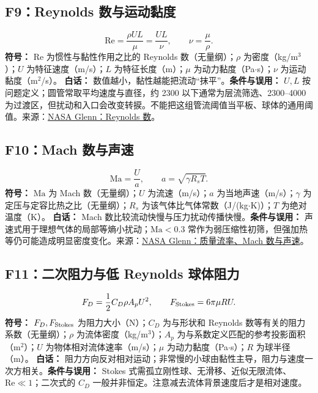 \documentclass[UTF8,zihao=-4,openany,oneside,fontset=windows]{ctexbook}
\begin{document}
\subsection{F9：Reynolds 数与运动黏度}
\begin{equation}
\mathrm{Re}=\frac{\rho UL}{\mu}=\frac{UL}{\nu},\qquad \nu=\frac\mu\rho.
\end{equation}
\textbf{符号：} $\mathrm{Re}$ 为惯性与黏性作用之比的 Reynolds 数（无量纲）；$\rho$ 为密度（kg/m$^3$）；$U$ 为特征速度（m/s）；$L$ 为特征长度（m）；$\mu$ 为动力黏度（Pa$\cdot$s）；$\nu$ 为运动黏度（m$^2$/s）。
\textbf{白话：} 数值越小，黏性越能把流动“抹平”。\textbf{条件与误用：} $U,L$ 按问题定义；圆管常取平均速度与直径，约 2300 以下通常为层流筛选、2300--4000 为过渡区，但扰动和入口会改变转捩。不能把这组管流阈值当平板、球体的通用阈值。来源：\href{https://www.grc.nasa.gov/WWW/k-12/airplane/reynolds.html}{NASA Glenn：Reynolds 数}。

\subsection{F10：Mach 数与声速}
\begin{equation}
\mathrm{Ma}=\frac Ua,\qquad a=\sqrt{\gamma R_sT}.
\end{equation}
\textbf{符号：} $\mathrm{Ma}$ 为 Mach 数（无量纲）；$U$ 为流速（m/s）；$a$ 为当地声速（m/s）；$\gamma$ 为定压与定容比热之比（无量纲）；$R_s$ 为该气体比气体常数（J/(kg$\cdot$K)）；$T$ 为绝对温度（K）。
\textbf{白话：} Mach 数比较流动快慢与压力扰动传播快慢。\textbf{条件与误用：} 声速式用于理想气体的局部等熵小扰动；$\mathrm{Ma}<0.3$ 常作为弱压缩性初筛，但强加热等仍可能造成明显密度变化。来源：\href{https://www1.grc.nasa.gov/beginners-guide-to-aeronautics/mass-flow-rate-equations/}{NASA Glenn：质量流率、Mach 数与声速}。

\subsection{F11：二次阻力与低 Reynolds 球体阻力}
\begin{equation}
F_D=\frac12C_D\rho A_pU^2,\qquad F_{\rm Stokes}=6\pi\mu RU.
\end{equation}
\textbf{符号：} $F_D,F_{\rm Stokes}$ 为阻力大小（N）；$C_D$ 为与形状和 Reynolds 数等有关的阻力系数（无量纲）；$\rho$ 为流体密度（kg/m$^3$）；$A_p$ 为与系数定义匹配的参考投影面积（m$^2$）；$U$ 为物体相对流体速率（m/s）；$\mu$ 为动力黏度（Pa$\cdot$s）；$R$ 为球半径（m）。
\textbf{白话：} 阻力方向反对相对运动；非常慢的小球由黏性主导，阻力与速度一次方相关。\textbf{条件与误用：} Stokes 式需孤立刚性球、无滑移、近似无限流体、$\mathrm{Re}\ll1$；二次式的 $C_D$ 一般并非恒定。注意减去流体背景速度后才是相对速度。
\end{document}
